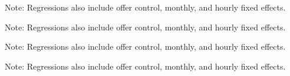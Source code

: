\documentclass[12pt]{article}
\begin{document}
\begin{landscape}

\noindent Note: Regressions also include offer control, monthly, and hourly fixed effects.
\end{landscape}

\begin{landscape}

\noindent Note: Regressions also include offer control, monthly, and hourly fixed effects.
\end{landscape}



%

%

\begin{landscape}

\noindent Note: Regressions also include offer control, monthly, and hourly fixed effects.
\end{landscape}

%

\begin{landscape}

\noindent Note: Regressions also include offer control, monthly, and hourly fixed effects.
\end{landscape}
\end{document}
